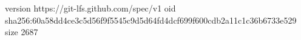 version https://git-lfs.github.com/spec/v1
oid sha256:60a58dd4ce3c5d56f9f5545c9d5d64fd4dcf699f600cdb2a11c1c36b6733e529
size 2687
